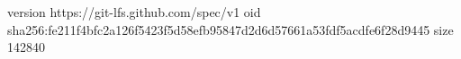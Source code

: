 version https://git-lfs.github.com/spec/v1
oid sha256:fe211f4bfc2a126f5423f5d58efb95847d2d6d57661a53fdf5acdfe6f28d9445
size 142840
